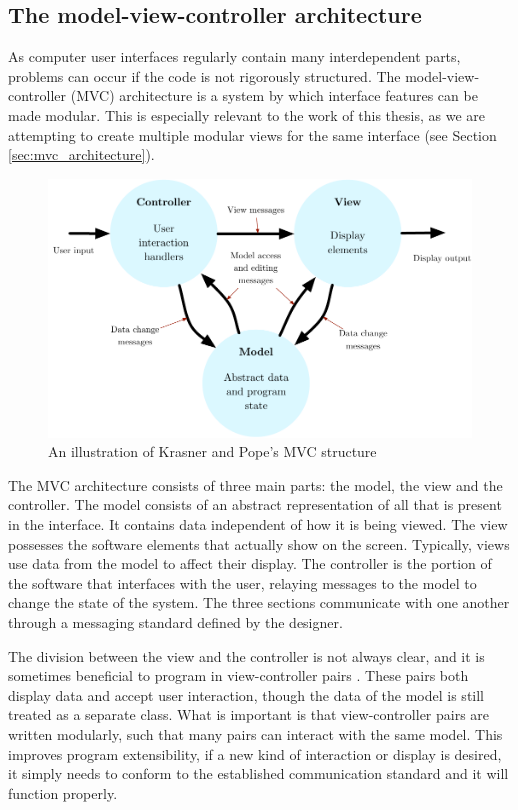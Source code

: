 \subsection{The model-view-controller architecture}
\label{sec:mvc_background}

As computer user interfaces regularly contain many interdependent parts, problems can occur if the code is not rigorously structured. The model-view-controller (MVC) architecture \cite{MVC_krasnerpope} is a system by which interface features can be made modular. This is especially relevant to the work of this thesis, as we are attempting to create multiple modular views for the same interface (see Section \ref{sec:mvc_architecture}).

\begin{figure}[h]
\centering
	\includegraphics[width=1\textwidth]{figures/MVC}
\caption{An illustration of Krasner and Pope's MVC structure}
\label{fig:mvc}
\end{figure}

The MVC architecture consists of three main parts: the model, the view and the controller. The model consists of an abstract representation of all that is present in the interface. It contains data independent of how it is being viewed. The view possesses the software elements that actually show on the screen. Typically, views use data from the model to affect their display. The controller is the portion of the software that interfaces with the user, relaying messages to the model to change the state of the system. The three sections communicate with one another through a messaging standard defined by the designer. 

The division between the view and the controller is not always clear, and it is sometimes beneficial to program in view-controller pairs \cite{MVC_krasnerpope}. These pairs both display data and accept user interaction, though the data of the model is still treated as a separate class. What is important is that view-controller pairs are written modularly, such that many pairs can interact with the same model. This improves program extensibility, if a new kind of interaction or display is desired, it simply needs to conform to the established communication standard and it will function properly.

